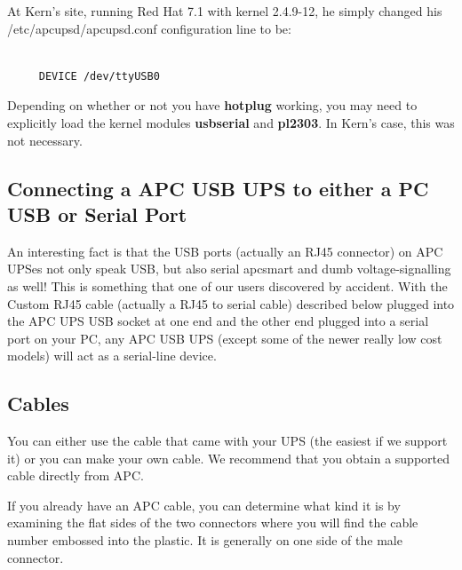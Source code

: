 {{{{{{{{{{At Kern's site, running Red Hat 7.1 with kernel 2.4.9-12, he simply changed
his /etc/apcupsd/apcupsd.conf configuration line to be: 

\footnotesize
\begin{verbatim}
     
     DEVICE /dev/ttyUSB0
\end{verbatim}
\normalsize

Depending on whether or not you have {\bf hotplug} working, you may need to
explicitly load the kernel modules {\bf usbserial} and {\bf pl2303}. In Kern's
case, this was not necessary. 

\label{Connecting-a-APC-USB-UPS-to-either-a-PC-USB-or-Serial-Port}

\subsection*{Connecting a APC USB UPS to either a PC USB or Serial Port}

An interesting fact is that the USB ports (actually an RJ45 connector) on APC
UPSes not only speak USB, but also serial apcsmart and dumb voltage-signalling
as well! This is something that one of our users discovered by accident. With
the Custom RJ45 cable (actually a RJ45 to serial cable) described below
plugged into the APC UPS USB socket at one end and the other end plugged into
a serial port on your PC, any APC USB UPS (except some of the newer really low
cost models) will act as a serial-line device. 

\label{Cables}

\subsection*{Cables}

\label{index-Cables-191}
You can either use the cable that came with your UPS (the easiest if we
support it) or you can make your own cable. We recommend that you obtain a
supported cable directly from APC.  

If you already have an APC cable, you can determine what kind it is by
examining the flat sides of the two connectors where you will find the cable
number embossed into the plastic. It is generally on one side of the male
connector.  

}}}}}}}}}}
